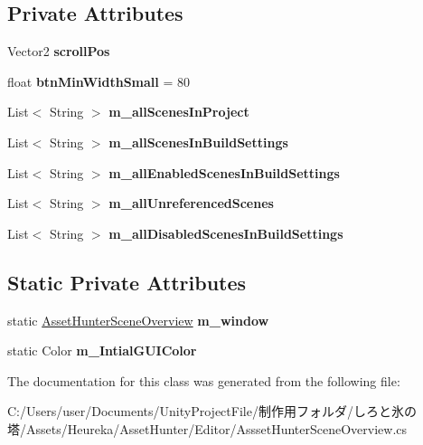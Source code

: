 \subsection*{Private Attributes}
\begin{DoxyCompactItemize}
\item 
\mbox{\label{class_asset_hunter_scene_overview_adc3eeb6c27ff50c942139674d6557c68}} 
Vector2 {\bfseries scroll\+Pos}
\item 
\mbox{\label{class_asset_hunter_scene_overview_ad57e56ee391bde706aadf0a9006a7bb6}} 
float {\bfseries btn\+Min\+Width\+Small} = 80
\item 
\mbox{\label{class_asset_hunter_scene_overview_ae173fc63d031dda5842d2895d3a06fe2}} 
List$<$ String $>$ {\bfseries m\+\_\+all\+Scenes\+In\+Project}
\item 
\mbox{\label{class_asset_hunter_scene_overview_ad453df337dbc5c806b30184c4c5ed4f3}} 
List$<$ String $>$ {\bfseries m\+\_\+all\+Scenes\+In\+Build\+Settings}
\item 
\mbox{\label{class_asset_hunter_scene_overview_af71f3a285997f2175e8ec934e8db8eae}} 
List$<$ String $>$ {\bfseries m\+\_\+all\+Enabled\+Scenes\+In\+Build\+Settings}
\item 
\mbox{\label{class_asset_hunter_scene_overview_a71cfc02514960e021ad114629bbe7fd0}} 
List$<$ String $>$ {\bfseries m\+\_\+all\+Unreferenced\+Scenes}
\item 
\mbox{\label{class_asset_hunter_scene_overview_a0405c843c71d3efded12d5d5686c4e45}} 
List$<$ String $>$ {\bfseries m\+\_\+all\+Disabled\+Scenes\+In\+Build\+Settings}
\end{DoxyCompactItemize}
\subsection*{Static Private Attributes}
\begin{DoxyCompactItemize}
\item 
\mbox{\label{class_asset_hunter_scene_overview_ae384224cb6cd33f0de10b217f5f06158}} 
static \hyperlink{class_asset_hunter_scene_overview}{Asset\+Hunter\+Scene\+Overview} {\bfseries m\+\_\+window}
\item 
\mbox{\label{class_asset_hunter_scene_overview_a041fe80be7507fce986d7beb65d90c18}} 
static Color {\bfseries m\+\_\+\+Intial\+G\+U\+I\+Color}
\end{DoxyCompactItemize}


The documentation for this class was generated from the following file\+:\begin{DoxyCompactItemize}
\item 
C\+:/\+Users/user/\+Documents/\+Unity\+Project\+File/制作用フォルダ/しろと氷の塔/\+Assets/\+Heureka/\+Asset\+Hunter/\+Editor/Assset\+Hunter\+Scene\+Overview.\+cs\end{DoxyCompactItemize}
